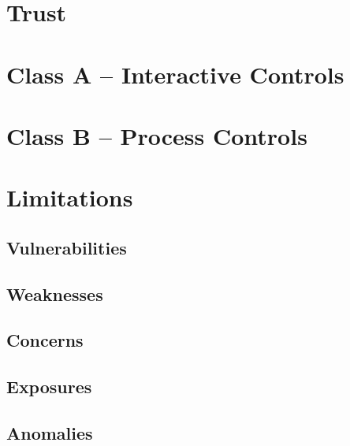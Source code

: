 \documentclass[10pt,a4paper,twoside,onecolumn]{article}
\begin{document}
\section{Trust}

\section{Class A -- Interactive Controls}

\section{Class B -- Process Controls}

\section{Limitations}

\subsection{Vulnerabilities}

\subsection{Weaknesses}

\subsection{Concerns}

\subsection{Exposures}

\subsection{Anomalies}
\end{document}
